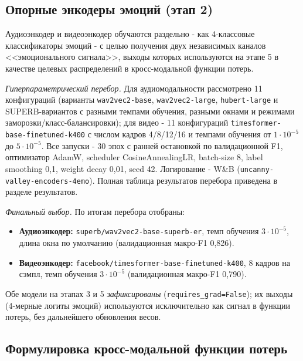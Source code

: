 \documentclass[a4paper, 12pt, oneside, openany]{article}
\begin{document}
\subsection{Опорные энкодеры эмоций (этап 2)}

Аудиоэнкодер и видеоэнкодер обучаются раздельно - как 4-классовые классификаторы эмоций - с целью получения двух независимых каналов <<эмоционального сигнала>>, выходы которых используются на этапе 5 в качестве целевых распределений в кросс-модальной функции потерь.

\textit{Гиперпараметрический перебор.} Для аудиомодальности рассмотрено 11 конфигураций (варианты \texttt{wav2vec2-base}, \texttt{wav2vec2-large}, \texttt{hubert-large} и SUPERB-вариантов с разными темпами обучения, разными окнами и режимами заморозки/класс-балансировки); для видео - 11 конфигураций \texttt{timesformer-base-finetuned-k400} с числом кадров 4/8/12/16 и темпами обучения от $1\!\cdot\!10^{-5}$ до $5\!\cdot\!10^{-5}$. Все запуски - 30 эпох с ранней остановкой по валидационной F1, оптимизатор AdamW, scheduler CosineAnnealingLR, batch-size 8, label smoothing 0,1, weight decay 0,01, seed 42. Логирование - W\&B (\texttt{uncanny-valley-encoders-4emo}). Полная таблица результатов перебора приведена в разделе результатов.

\textit{Финальный выбор.} По итогам перебора отобраны:
\begin{itemize}
\item \textbf{Аудиоэнкодер:} \texttt{superb/wav2vec2-base-superb-er}, темп обучения $3\!\cdot\!10^{-5}$, длина окна по умолчанию (валидационная макро-F1 0,826).
\item \textbf{Видеоэнкодер:} \texttt{facebook/timesformer-base-finetuned-k400}, 8 кадров на сэмпл, темп обучения $3\!\cdot\!10^{-5}$ (валидационная макро-F1 0,790).
\end{itemize}

Обе модели на этапах 3 и 5 \textit{зафиксированы} (\texttt{requires\_grad=False}); их выходы (4-мерные логиты эмоций) используются исключительно как сигнал в функции потерь, без дальнейшего обновления весов.

\subsection{Формулировка кросс-модальной функции потерь}
\end{document}
